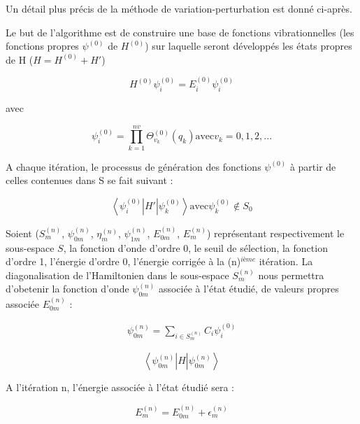 Un détail plus précis de la méthode de variation-perturbation est donné ci-après.

Le but de l'algorithme est de construire une base de fonctions vibrationnelles (les fonctions propres $\psi^{(0)}$ de $H^{(0)}$) sur laquelle seront développés les états propres de H ($H=H^{(0)} + H'$)

\begin{equation}
H^{(0)} \psi^{(0)}_{i} = E^{(0)}_{i}  \psi^{(0)}_{i} 
\end{equation}

avec

\begin{equation}
\psi^{(0)}_{i} = \prod^{nv}_{k=1} \Theta^{(0)}_{v_k}(q_k) \text{avec} v_k = 0,1,2, ...
\end{equation}

A chaque itération, le processus de génération des fonctions $\psi^{(0)}$ à partir de celles contenues dans S se fait suivant :

\begin{equation} 
      \left\langle \psi^{(0)}_{i} \right \vert H' \left  \vert \psi^{(0)}_{k} \right\rangle \text{avec}  \psi^{(0)}_{k} \notin S_0
\end{equation}

Soient ($S^{(n)}_{m}$, $\psi^{(n)}_{0m}$, $\eta^{(n)}_{m}$, $\psi^{(n)}_{1m}$, $E^{(n)}_{0m}$, $E^{(n)}_{m}$) représentant respectivement le sous-espace $S$, la fonction d'onde d'ordre 0, le seuil de sélection, la fonction d'ordre 1, l'énergie d'ordre 0, l'énergie corrigée à la (n)$^{ième}$ itération. La diagonalisation de l'Hamiltonien dans le sous-espace $S^{(n)}_{m}$ nous permettra d'obetenir la fonction d'onde $\psi^{(n)}_{0m}$ associée à l'état étudié, de valeurs propres associée $E^{(n)}_{0m}$ :


\begin{align} \label{dev}
	\psi^{(n)}_{0m} =  \sum_{i \in  S^{(n)}_{m}}  C_i \psi^{(0)}_{i}
\end{align}

\begin{equation}
	 \left\langle \psi^{(n)}_{0m} \right| H \left| \psi^{(n)}_{0m} \right\rangle 
\end{equation}

A l'itération n, l'énergie associée à l'état étudié sera :

\begin{equation}
	  E^{(n)}_{m} = E^{(n)}_{0m} + \epsilon^{(n)}_{m}
\end{equation}


